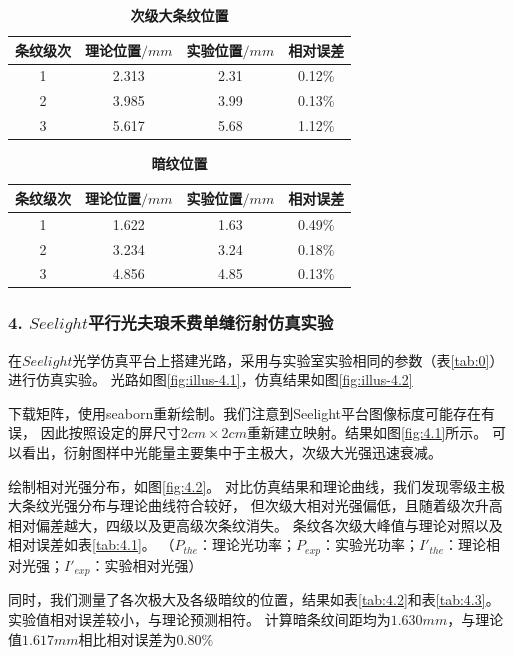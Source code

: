 \documentclass[12pt,a4paper,UTF8]{ctexart}
\begin{document}
\begin{table}[htbp]
	\centering
		\begin{tabular}{cccc}
			\toprule
			条纹级次	&理论位置$/mm$	&实验位置$/mm$	&相对误差 \\
			\midrule
			1  &2.313  &2.31  &0.12\% \\
			2  &3.985  &3.99  &0.13\% \\
			3  &5.617  &5.68  &1.12\% \\	
			\bottomrule
		\end{tabular}
		\caption{\textbf{次级大条纹位置}}
		\label{tab:3.2}
\end{table}
\begin{table}[htbp]
	\centering
		\begin{tabular}{cccc}
			\toprule
			条纹级次	&理论位置$/mm$	&实验位置$/mm$	&相对误差 \\
			\midrule
			1  &1.622  &1.63  &0.49\% \\
			2  &3.234  &3.24   &0.18\% \\
			3  &4.856  &4.85   &0.13\% \\	
			\bottomrule
		\end{tabular}
		\caption{\textbf{暗纹位置}}
		\label{tab:3.3}
\end{table}

\subsubsection*{4. $Seelight$平行光夫琅禾费单缝衍射仿真实验}

在$Seelight$光学仿真平台上搭建光路，采用与实验室实验相同的参数（表\ref{tab:0}）进行仿真实验。
光路如图\ref{fig:illus-4.1}，仿真结果如图\ref{fig:illus-4.2}

下载矩阵，使用seaborn重新绘制。我们注意到Seelight平台图像标度可能存在有误，
因此按照设定的屏尺寸$2cm \times 2cm$重新建立映射。结果如图\ref{fig:4.1}所示。
可以看出，衍射图样中光能量主要集中于主极大，次级大光强迅速衰减。

绘制相对光强分布，如图\ref{fig:4.2}。
对比仿真结果和理论曲线，我们发现零级主极大条纹光强分布与理论曲线符合较好，
但次级大相对光强偏低，且随着级次升高相对偏差越大，四级以及更高级次条纹消失。
条纹各次级大峰值与理论对照以及相对误差如表\ref{tab:4.1}。
（$P_{the}$：理论光功率；$P_{exp}$：实验光功率；$I'_{the}$：理论相对光强；$I'_{exp}$：实验相对光强）

同时，我们测量了各次极大及各级暗纹的位置，结果如表\ref{tab:4.2}和表\ref{tab:4.3}。
实验值相对误差较小，与理论预测相符。
计算暗条纹间距均为$1.630mm$，与理论值$1.617mm$相比相对误差为$0.80\%$
\end{document}
